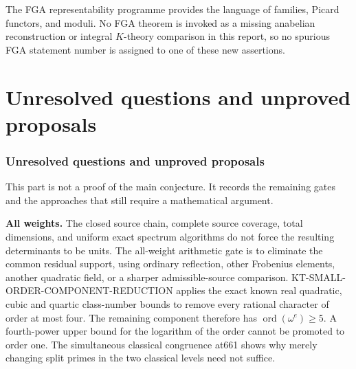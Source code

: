 \documentclass[11pt,a4paper]{article}
\theoremstyle{definition}
\renewcommand{\paragraph}[1]{\par\smallskip\noindent\textbf{#1}\quad\ignorespaces}
\begin{document}
The FGA representability programme provides the language of
families, Picard functors, and moduli. No FGA theorem is
invoked as a missing anabelian reconstruction or integral
$K$-theory comparison in this report, so no spurious FGA
statement number is assigned to one of these new assertions.


\part{Unresolved questions and unproved proposals}

\section{Unresolved questions and unproved proposals}

This part is not a proof of the main conjecture. It records the
remaining gates and the approaches that still require a
mathematical argument.

\paragraph{All weights.}
The closed source chain, complete source coverage, total
dimensions, and uniform exact spectrum algorithms do not
force the resulting determinants to be units. The all-weight
arithmetic gate is to eliminate the common residual support,
using ordinary reflection, other Frobenius elements, another
quadratic field, or a sharper admissible-source comparison.
KT-SMALL-ORDER-COMPONENT-REDUCTION applies the exact known
real quadratic, cubic and quartic class-number bounds to
remove every rational character of order at most four.
The remaining component therefore has
$\operatorname{ord}(\omega^e)\ge5$.
A fourth-power upper bound for the logarithm of the order
cannot be promoted to order one. The simultaneous classical
congruence at661 shows why merely changing split primes in
the two classical levels need not suffice.
\end{document}
